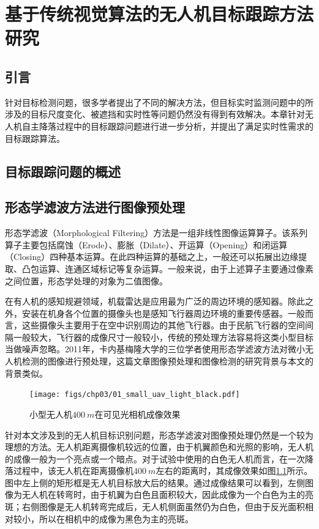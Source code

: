 \chapter{基于传统视觉算法的无人机目标跟踪方法研究}


\section{引言}
针对目标检测问题，很多学者提出了不同的解决方法，但目标实时监测问题中的所涉及的目标尺度变化、被遮挡和实时性等问题仍然没有得到有效解决。本章针对无人机自主降落过程中的目标跟踪问题进行进一步分析，并提出了满足实时性需求的目标跟踪算法。

\section{目标跟踪问题的概述}

 
\section{形态学滤波方法进行图像预处理}

形态学滤波（Morphological Filtering）方法是一组非线性图像运算算子。该系列算子主要包括腐蚀（Erode）、膨胀（Dilate）、开运算（Opening）和闭运算（Closing）四种基本运算。在此四种运算的基础之上，一般还可以拓展出边缘提取、凸包运算、连通区域标记等复杂运算。一般来说，由于上述算子主要通过像素之间位置，形态学处理的对象为二值图像。

在有人机的感知规避领域，机载雷达是应用最为广泛的周边环境的感知器。除此之外，安装在机身各个位置的摄像头也是感知飞行器周边环境的重要传感器。一般而言，这些摄像头主要用于在空中识别周边的其他飞行器。由于民航飞行器的空间间隔一般较大，飞行器的成像尺寸一般较小，传统的预处理方法容易将这类小型目标当做噪声忽略。2011年，卡内基梅隆大学的三位学者使用形态学滤波方法对微小无人机检测的图像进行预处理\cite{dey2011cascaded}，这篇文章图像预处理和图像检测的研究背景与本文的背景类似。
\begin{figure}[htb]   
	\centering
	\texttt{[image: figs/chp03/01\_small\_uav\_light\_black.pdf]}
	\caption{小型无人机$400\ m$在可见光相机成像效果}
	\label{fig:01_small_uav_light_black}
\end{figure}

针对本文涉及到的无人机目标识别问题，形态学滤波对图像预处理仍然是一个较为理想的方法。无人机距离摄像机较远的位置，由于机翼颜色和光照的影响，无人机的成像一般为一个亮点或一个暗点。对于试验中使用的白色无人机而言，在一次降落过程中，该无人机在距离摄像机$400\ m$左右的距离时，其成像效果如图\ref{fig:01_small_uav_light_black}所示。图中左上侧的矩形框是无人机目标放大后的结果。通过成像结果可以看到，左侧图像为无人机在转弯时，由于机翼为白色且面积较大，因此成像为一个白色为主的亮斑；右侧图像是无人机转弯完成后，无人机侧面虽然仍为白色，但由于反光面积相对较小，所以在相机中的成像为黑色为主的亮斑。


